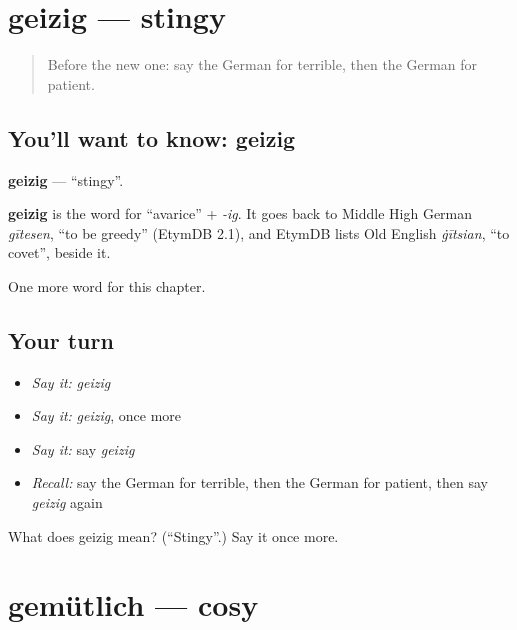\section[geizig]{geizig — stingy}

\label{lesson:GE-C214-geizig}



\begin{quote}
Before the new one: say the German for terrible, then the German for patient.
\end{quote}

\subsection*{You'll want to know: geizig}
\textbf{geizig} — \textquotedblleft{}stingy\textquotedblright{}.

\begin{cousinweb}
\textbf{geizig} is the word for \textquotedblleft{}avarice\textquotedblright{} + \emph{-ig}. It goes back to Middle High German \emph{gītesen}, \textquotedblleft{}to be greedy\textquotedblright{} (EtymDB 2.1), and EtymDB lists Old English \emph{ġītsian}, \textquotedblleft{}to covet\textquotedblright{}, beside it.
\end{cousinweb}

\begin{grammarlens}[title={What you've built}]
One more word for this chapter.
\end{grammarlens}

\subsection*{Your turn}
\begin{itemize}
\raggedright
  \item \emph{Say it:} \emph{geizig}
  \item \emph{Say it:} \emph{geizig}, once more
  \item \emph{Say it:} say \emph{geizig}
  \item \emph{Recall:} say the German for terrible, then the German for patient, then say \emph{geizig} again
\end{itemize}

\begin{tcolorbox}[breakable,colback=teal!4,colframe=teal!35!black,title={Before you move on}]
What does geizig mean? (\textquotedblleft{}Stingy\textquotedblright{}.) Say it once more.
\end{tcolorbox}
\section[gemütlich]{gemütlich — cosy}

